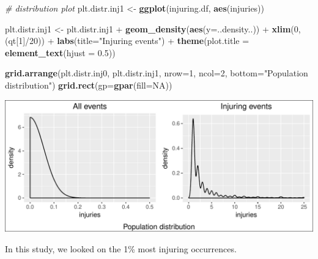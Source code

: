 \documentclass[]{article}
\newenvironment{Shaded}{\begin{snugshade}}{\end{snugshade}}
\newcommand{\KeywordTok}[1]{\textcolor[rgb]{0.13,0.29,0.53}{\textbf{{#1}}}}
\newcommand{\DataTypeTok}[1]{\textcolor[rgb]{0.13,0.29,0.53}{{#1}}}
\newcommand{\DecValTok}[1]{\textcolor[rgb]{0.00,0.00,0.81}{{#1}}}
\newcommand{\FloatTok}[1]{\textcolor[rgb]{0.00,0.00,0.81}{{#1}}}
\newcommand{\StringTok}[1]{\textcolor[rgb]{0.31,0.60,0.02}{{#1}}}
\newcommand{\CommentTok}[1]{\textcolor[rgb]{0.56,0.35,0.01}{\textit{{#1}}}}
\newcommand{\OtherTok}[1]{\textcolor[rgb]{0.56,0.35,0.01}{{#1}}}
\newcommand{\NormalTok}[1]{{#1}}
\begin{document}
\begin{Shaded}
\begin{Highlighting}[]
\CommentTok{# distribution plot}
\NormalTok{plt.distr.inj1 <-}\StringTok{ }\KeywordTok{ggplot}\NormalTok{(injuring.df, }\KeywordTok{aes}\NormalTok{(injuries))}

\NormalTok{plt.distr.inj1 <-}\StringTok{ }\NormalTok{plt.distr.inj1 +}\StringTok{ }\KeywordTok{geom_density}\NormalTok{(}\KeywordTok{aes}\NormalTok{(}\DataTypeTok{y=}\NormalTok{..density..)) +}\StringTok{ }\KeywordTok{xlim}\NormalTok{(}\DecValTok{0}\NormalTok{,(qt[}\DecValTok{1}\NormalTok{]/}\DecValTok{20}\NormalTok{)) +}\StringTok{ }
\StringTok{        }\KeywordTok{labs}\NormalTok{(}\DataTypeTok{title=}\StringTok{"Injuring events"}\NormalTok{) +}
\StringTok{        }\KeywordTok{theme}\NormalTok{(}\DataTypeTok{plot.title =} \KeywordTok{element_text}\NormalTok{(}\DataTypeTok{hjust =} \FloatTok{0.5}\NormalTok{))       }
\end{Highlighting}
\end{Shaded}

\begin{Shaded}
\begin{Highlighting}[]
\KeywordTok{grid.arrange}\NormalTok{(plt.distr.inj0, plt.distr.inj1,}
             \DataTypeTok{nrow=}\DecValTok{1}\NormalTok{, }\DataTypeTok{ncol=}\DecValTok{2}\NormalTok{, }
             \DataTypeTok{bottom=}\StringTok{"Population distribution"}\NormalTok{)}
\KeywordTok{grid.rect}\NormalTok{(}\DataTypeTok{gp=}\KeywordTok{gpar}\NormalTok{(}\DataTypeTok{fill=}\OtherTok{NA}\NormalTok{))}
\end{Highlighting}
\end{Shaded}

\includegraphics{readme_files/figure-latex/inj-distribution-1.pdf}

In this study, we looked on the 1\% most injuring occurrences.
\end{document}

